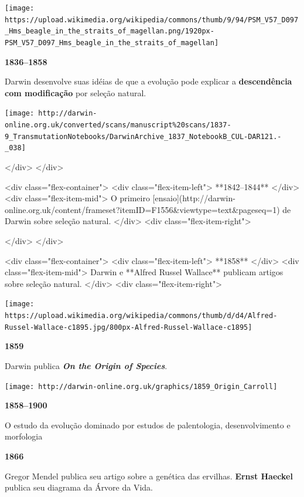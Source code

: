 \documentclass[
]{book}
\begin{document}
\begin{flushleft}\texttt{[image: https://upload.wikimedia.org/wikipedia/commons/thumb/9/94/PSM\_V57\_D097\_Hms\_beagle\_in\_the\_straits\_of\_magellan.png/1920px-PSM\_V57\_D097\_Hms\_beagle\_in\_the\_straits\_of\_magellan]} \end{flushleft}

\textbf{1836--1858}

Darwin desenvolve suas idéias de que a evolução pode explicar a \textbf{descendência com modificação} por seleção natural.

\begin{flushleft}\texttt{[image: http://darwin-online.org.uk/converted/scans/manuscript\%20scans/1837-9\_TransmutationNotebooks/DarwinArchive\_1837\_NotebookB\_CUL-DAR121.-\_038]} \end{flushleft}
  </div>
</div>

<div class="flex-container">
  <div class="flex-item-left">
  **1842--1844**
  </div>
  <div class="flex-item-mid">
  O primeiro [ensaio](http://darwin-online.org.uk/content/frameset?itemID=F1556&viewtype=text&pageseq=1) de Darwin sobre seleção natural.
  </div>
  <div class="flex-item-right">
 
  </div>
</div>

<div class="flex-container">
  <div class="flex-item-left">
  **1858**
  </div>
  <div class="flex-item-mid">
  Darwin e **Alfred Russel Wallace** publicam artigos sobre seleção natural.
  </div>
  <div class="flex-item-right">

\begin{flushleft}\texttt{[image: https://upload.wikimedia.org/wikipedia/commons/thumb/d/d4/Alfred-Russel-Wallace-c1895.jpg/800px-Alfred-Russel-Wallace-c1895]} \end{flushleft}

\textbf{1859}

Darwin publica \textbf{\emph{On the Origin of Species}}.

\begin{flushleft}\texttt{[image: http://darwin-online.org.uk/graphics/1859\_Origin\_Carroll]} \end{flushleft}

\textbf{1858--1900}

O estudo da evolução dominado por estudos de palentologia, desenvolvimento e morfologia

\textbf{1866}

Gregor Mendel publica seu artigo sobre a genética das ervilhas. \textbf{Ernst Haeckel} publica seu diagrama da Árvore da Vida.
\end{document}
